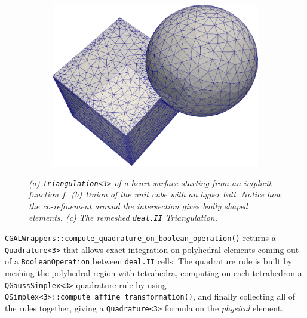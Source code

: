 \documentclass{ansarticle-preprint}
\newcommand{\specialword}[1]{\texttt{#1}}
\newcommand{\dealii}{{\specialword{deal.II}}\xspace}
\begin{document}
\begin{figure}
\begin{subfigure}[b]{0.28\textwidth}
      \caption{\label{fig:corefinement}}
    \end{subfigure}
    \hfill
    \begin{subfigure}[b]{0.35\textwidth}
      \centering
      \includegraphics[width=\textwidth]{png/cube_sphere_remeshed.png}
      \caption{ \label{fig:corefinement_remeshed}}
    \end{subfigure}
    \caption{\it (a) \texttt{Triangulation<3>} of a heart surface starting from an implicit function $f$. (b) Union of the unit cube with an hyper ball. Notice how the co-refinement around the intersection gives badly shaped elements. (c) The remeshed \dealii{} Triangulation.}
  \end{figure}
  
\texttt{CGALWrappers::compute\_quadrature\_on\_boolean\_operation()} returns a \texttt{Quadrature<3>} that allows exact integration on polyhedral elements coming out of a \texttt{BooleanOperation} between \dealii cells.
The quadrature rule is built by meshing the polyhedral region with tetrahedra, computing on each tetrahedron a \texttt{QGaussSimplex<3>} quadrature rule by using \texttt{QSimplex<3>::\allowbreak{}compute\_affine\_transformation()}, and finally
collecting all of the rules together, giving a \texttt{Quadrature<3>} formula on the \emph{physical} element.
\end{document}
